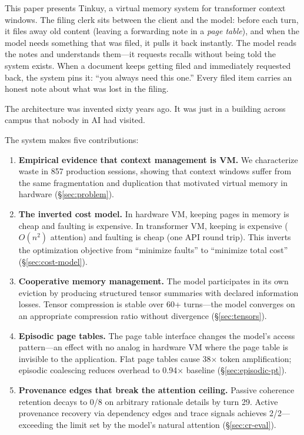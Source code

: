 \documentclass[sigplan,screen,anonymous]{acmart}
\begin{document}
This paper presents Tinkuy, a virtual memory system for transformer
context windows. The filing clerk sits between the client and the
model: before each turn, it files away old content (leaving a
forwarding note in a \emph{page table}), and when the model needs
something that was filed, it pulls it back instantly. The model reads
the notes and understands them---it requests recalls without being
told the system exists. When a document keeps getting filed and
immediately requested back, the system pins it: ``you always need this
one.'' Every filed item carries an honest note about what was lost in
the filing.

The architecture was invented sixty years ago. It was just in a
building across campus that nobody in AI had visited.

The system makes five contributions:

\begin{enumerate}
\item \textbf{Empirical evidence that context management is VM.} We
  characterize waste in 857 production sessions, showing that context
  windows suffer from the same fragmentation and duplication that
  motivated virtual memory in hardware (\S\ref{sec:problem}).

\item \textbf{The inverted cost model.} In hardware VM, keeping pages
  in memory is cheap and faulting is expensive. In transformer VM,
  keeping is expensive ($O(n^2)$ attention) and faulting is cheap (one
  API round trip). This inverts the optimization objective from
  ``minimize faults'' to ``minimize total cost''
  (\S\ref{sec:cost-model}).

\item \textbf{Cooperative memory management.} The model participates
  in its own eviction by producing structured tensor summaries with
  declared information losses. Tensor compression is stable over 60+
  turns---the model converges on an appropriate compression ratio
  without divergence (\S\ref{sec:tensors}).

\item \textbf{Episodic page tables.} The page table interface changes
  the model's access pattern---an effect with no analog in hardware VM
  where the page table is invisible to the application. Flat page
  tables cause 38$\times$ token amplification; episodic coalescing
  reduces overhead to 0.94$\times$ baseline
  (\S\ref{sec:episodic-pt}).

\item \textbf{Provenance edges that break the attention ceiling.}
  Passive coherence retention decays to 0/8 on arbitrary rationale
  details by turn 29. Active provenance recovery via dependency edges
  and trace signals achieves 2/2---exceeding the limit set by the
  model's natural attention (\S\ref{sec:cr-eval}).
\end{enumerate}
\end{document}
